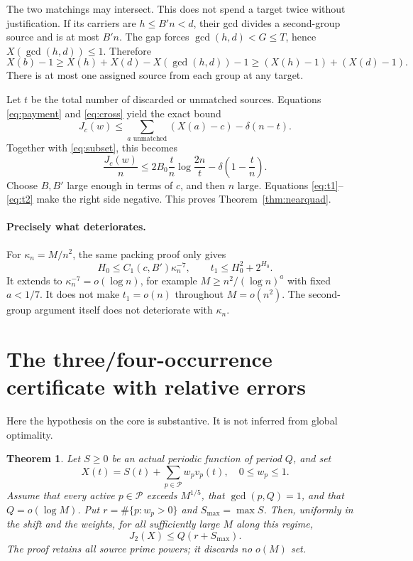 \documentclass[11pt,a4paper]{article}
\newtheorem{theorem}{Theorem}[section]
\newcommand{\Pset}{\mathcal P}
\begin{document}
The two matchings may intersect. This does not spend a target twice
without justification. If its carriers are $h\le B'n<d$, their gcd
divides a second-group source and is at most $B'n$. The gap forces
$\gcd(h,d)<G\le T$, hence $X(\gcd(h,d))\le1$. Therefore
\begin{equation}
 X(b)-1\ge X(h)+X(d)-X(\gcd(h,d))-1
 \ge (X(h)-1)+(X(d)-1).                              \label{eq:cross}
\end{equation}
There is at most one assigned source from each group at any target.

Let $t$ be the total number of discarded or unmatched sources.
Equations \eqref{eq:payment} and \eqref{eq:cross} yield the exact bound
\[
 J_c(w)\le\sum_{a\text{ unmatched}}(X(a)-c)-\delta(n-t).
\]
Together with \eqref{eq:subset}, this becomes
\begin{equation}
 \boxed{\quad
 \frac{J_c(w)}n\le
 2B_0\frac tn\log\frac{2n}t-\delta\left(1-\frac tn\right).
 \quad}                                               \label{eq:closing}
\end{equation}
Choose $B,B'$ large enough in terms of $c$, and then $n$ large.
Equations \eqref{eq:t1}--\eqref{eq:t2} make the right side negative.
This proves Theorem~\ref{thm:nearquad}.

\paragraph{Precisely what deteriorates.}
For $\kappa_n=M/n^2$, the same packing proof only gives
\[
 H_0\le C_1(c,B')\kappa_n^{-7},\qquad
 t_1\le H_0^2+2^{H_0}.
\]
It extends to $\kappa_n^{-7}=o(\log n)$, for example
$M\ge n^2/(\log n)^a$ with fixed $a<1/7$. It does not make
$t_1=o(n)$ throughout $M=o(n^2)$. The second-group argument itself
does not deteriorate with $\kappa_n$.

\section{The three/four-occurrence certificate with relative errors}

Here the hypothesis on the core is substantive. It is not inferred from
global optimality.

\begin{theorem}\label{thm:core}
Let $S\ge0$ be an actual periodic function of period $Q$, and set
\[
 X(t)=S(t)+\sum_{p\in\Pset}w_pv_p(t),\quad 0\le w_p\le1.
\]
Assume that every active $p\in\Pset$ exceeds $M^{1/5}$, that
$\gcd(p,Q)=1$, and that $Q=o(\log M)$. Put
$r=\#\{p:w_p>0\}$ and $S_{\max}=\max S$. Then, uniformly in the
shift and the weights, for all sufficiently large $M$ along this regime,
\begin{equation}
 \boxed{J_2(X)\le Q(r+S_{\max}).}                     \label{eq:fullcore}
\end{equation}
The proof retains all source prime powers; it discards no $o(M)$ set.
\end{theorem}
\end{document}
